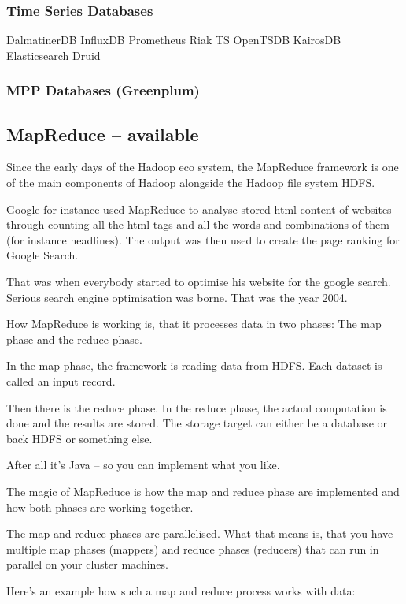\documentclass[12pt]{scrartcl} %
\begin{document}
\subsubsection{Time Series Databases}
DalmatinerDB 
InfluxDB 
Prometheus 
Riak TS
OpenTSDB
KairosDB 
Elasticsearch 
Druid 
\subsubsection{MPP Databases (Greenplum)}



\subsection{MapReduce -- available}

Since the early days of the Hadoop eco system, the MapReduce framework is one of the main components of Hadoop alongside the Hadoop file system HDFS.

Google for instance used MapReduce to analyse stored html content of websites through counting all the html tags and all the words and combinations of them (for instance headlines). The output was then used to create the page ranking for Google Search.

That was when everybody started to optimise his website for the google search. Serious search engine optimisation was borne. That was the year 2004.

How MapReduce is working is, that it processes data in two phases: The map phase and the reduce phase.

In the map phase, the framework is reading data from HDFS. Each dataset is called an input record.

Then there is the reduce phase. In the reduce phase, the actual computation is done and the results are stored. The storage target can either be a database or back HDFS or something else.

After all it’s Java – so you can implement what you like.

The magic of MapReduce is how the map and reduce phase are implemented and how both phases are working together.

The map and reduce phases are parallelised. What that means is, that you have multiple map phases (mappers) and reduce phases (reducers) that can run in parallel on your cluster machines.

Here's an example how such a map and reduce process works with data:
\end{document}
